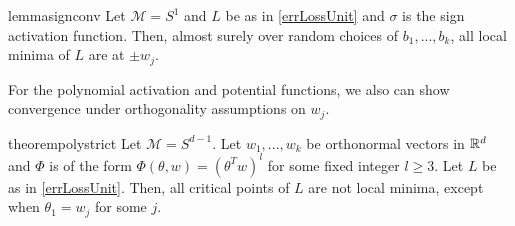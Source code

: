 \begin{restatable}{lemma}{signconv}
\label{SignConv}
Let $\mathcal{M} = S^1$ and $L$ be as in \eqref{errLossUnit} and $\sigma$ is the sign activation function. Then, almost surely over random choices of $b_1,...,b_k$, all local minima of $L$ are at $\pm w_j$. 
\end{restatable}
%
For the polynomial activation and potential functions, we also can show convergence under orthogonality assumptions on $w_j$. 

\begin{restatable}{theorem}{polystrict}
\label{PolyStrict}
Let $\mathcal{M} = S^{d-1}$. Let $w_1,...,w_k$ be orthonormal vectors in ${\mathbb{R}}^d$ and $\Phi$ is of the form $\Phi(\theta,w) = (\theta^Tw)^l$ for some fixed integer $l \geq 3$. Let $L$ be as in \eqref{errLossUnit}. Then, all critical points of $L$ are not local minima, except when $\theta_1 = w_j$ for some $j$.   
\end{restatable}


